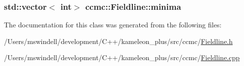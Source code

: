 \hypertarget{classccmc_1_1_fieldline_ae2e528d518e0342ecf3ec1241a5eeac0}{
\subsubsection[{minima}]{\setlength{\rightskip}{0pt plus 5cm}std\-::vector$<$ int$>$ ccmc\-::\-Fieldline\-::minima}}\label{classccmc_1_1_fieldline_ae2e528d518e0342ecf3ec1241a5eeac0}


The documentation for this class was generated from the following files\-:\begin{DoxyCompactItemize}
\item 
/\-Users/mswindell/development/\-C++/kameleon\-\_\-plus/src/ccmc/\hyperlink{_fieldline_8h}{Fieldline.\-h}\item 
/\-Users/mswindell/development/\-C++/kameleon\-\_\-plus/src/ccmc/\hyperlink{_fieldline_8cpp}{Fieldline.\-cpp}\end{DoxyCompactItemize}
